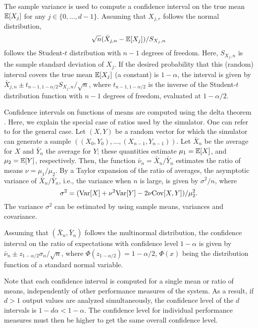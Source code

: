 The sample variance is used to compute a confidence interval on the
true mean $\mathbb{E}[X_j]$ for any $j\in\{0, \ldots, d-1\}$.  Assuming that
$X_{j, r}$ follows the normal distribution,
\[\sqrt{n}(\bar X_{j, n} - \mathbb{E}[X_j])/S_{X_j, n}\]
follows the Student-$t$ distribution with $n-1$ degrees of freedom.
Here, $S_{X_j, n}$ is the sample standard deviation of $X_j$.
If the desired probability that this (random)
interval covers the true mean $\mathbb{E}[X_j]$ (a constant) is $1-\alpha$,
the interval is given by $\bar X_{j, n}\pm t_{n-1, 1-\alpha/2}S_{X_j,
  n}/\sqrt{n}$, where $t_{n-1,1-\alpha/2}$ is the inverse of the
Student-$t$ distribution function with $n-1$ degrees of freedom,
evaluated at $1-\alpha/2$.

Confidence intervals on functions of means are computed
using the delta theorem \cite{tSER80a}.
Here, we explain the special case of ratios used by the simulator.
One can refer to \cite{tSER80a,sLEC06a,iBUI05b} for the general case.
Let $(X,Y)$ be a random vector for which the simulator can
generate a sample $((X_0, Y_0), \ldots, (X_{n-1}, Y_{n-1}))$.  Let
$\bar X_n$ be the average for $X$ and $\bar Y_n$ the average for $Y$;
these quantities estimate $\mu_1=\mathbb{E}[X]$, and $\mu_2=\mathbb{E}[Y]$,
respectively.
Then, the function $\bar\nu_n=\bar X_n/\bar Y_n$
estimates the ratio of means $\nu=\mu_1/\mu_2$.  By a Taylor expansion
of the ratio of averages,
the asymptotic variance of $\bar X_n/\bar Y_n$, i.e., the variance
when $n$ is large, is given by $\sigma^2/n$, where
\[\sigma^2=(\mathrm{Var}[X] + \nu^2\mathrm{Var}[Y] - 2\nu\mathrm{Cov}[X, Y])/\mu_2^2.\]
The variance
$\sigma^2$ can be estimated by using sample means, variances and covariance.

Assuming that $(\bar X_n, \bar Y_n)$ follows the multinormal
distribution,
the confidence interval on the ratio of expectations with confidence
level $1-\alpha$ is given by $\bar\nu_n\pm
z_{1-\alpha/2}\sigma_n/\sqrt{n}$, where
$\Phi(z_{1-\alpha/2})=1-\alpha/2$, $\Phi(x)$ being the distribution
function of a standard normal variable.

Note that each confidence interval is computed for a single mean or
ratio of means, independently of other performance measures of the
system.  As a result, if $d>1$ output values are analyzed
simultaneously, the confidence level of the $d$ intervals
is $1-d\alpha<1-\alpha$.
The confidence level for individual performance measures must then be
higher to get the same overall confidence level.

